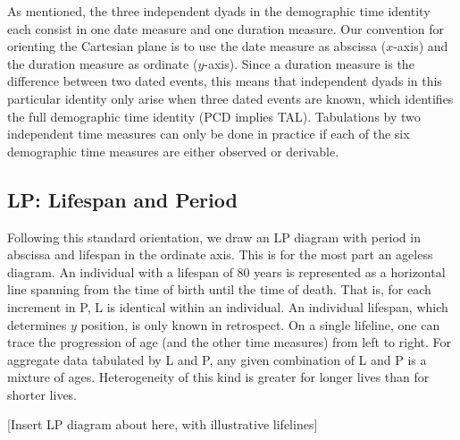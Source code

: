 As mentioned, the three independent dyads in the demographic time identity each consist in one date measure and one duration measure. Our convention for orienting the Cartesian plane is to use the date measure as abscissa ($x$-axis) and the duration measure as ordinate ($y$-axis). Since a duration measure is the difference between two dated events, this means that independent dyads in this particular identity only arise when three dated events are known, which identifies the full demographic time identity (PCD implies TAL). Tabulations by two independent time measures can only be done in practice if each of the six demographic time measures are either observed or derivable. 

\subsection{LP: Lifespan and Period}
Following this standard orientation, we draw an LP diagram with period in abscissa and lifespan in the ordinate axis. This is for the most part an ageless diagram. An individual with a lifespan of 80 years is represented as a horizontal line spanning from the time of birth until the time of death. That is, for each increment in P, L is identical within an individual. An individual lifespan, which determines $y$ position, is only known in retrospect. On a single lifeline, one can trace the progression of age (and the other time measures) from left to right. For aggregate data tabulated by L and P, any given combination of L and P is a mixture of ages. Heterogeneity of this kind is greater for longer lives than for shorter lives.

[Insert LP diagram about here, with illustrative lifelines]



